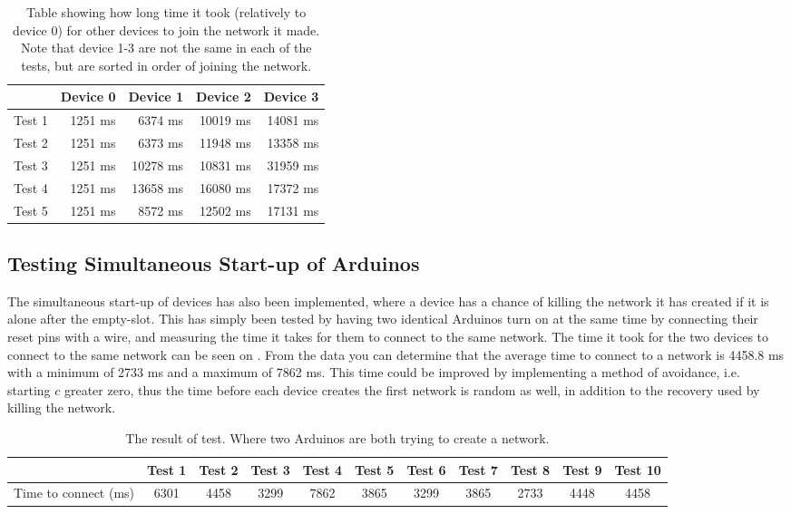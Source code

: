 \begin{table}[H]
\footnotesize
\centering  
{}
\begin{tabular}{r | r r r r}
        & Device 0  & Device 1  & Device 2  & Device 3  \\\midrule
 Test 1 &   1251 ms &   6374 ms &   10019 ms&   14081 ms\\
 Test 2 &   1251 ms &   6373 ms &   11948 ms&   13358 ms\\
 Test 3 &   1251 ms &   10278 ms&   10831 ms&   31959 ms\\
 Test 4 &   1251 ms &   13658 ms&   16080 ms&   17372 ms\\
 Test 5 &   1251 ms &   8572 ms &   12502 ms&   17131 ms\\   
\end{tabular}
\caption{Table showing how long time it took (relatively to device 0) for other devices to join the network it made. Note that device 1-3 are not the same in each of the tests, but are sorted in order of joining the network.}
\label{tab:ccrc_test}
\end{table}

\subsection{Testing Simultaneous Start-up of Arduinos}
The simultaneous start-up of devices has also been implemented, where a device has a chance of killing the network it has created if it is alone after the empty-slot.
This has simply been tested by having two identical Arduinos turn on at the same time by connecting their reset pins with a wire, and measuring the time it takes for them to connect to the same network.
The time it took for the two devices to connect to the same network can be seen on .
From the data you can determine that the average time to connect to a network is 4458.8 ms with a minimum of 2733 ms and a maximum of 7862 ms.
This time could be improved by implementing a method of avoidance, i.e. starting $c$ greater zero, thus the time before each device creates the first network is random as well, in addition to the recovery used by killing the network.

\begin{table}[H]
\centering\scriptsize
\begin{tabularx}{\textwidth}{X|c c c c c c c c c c}
                          & Test 1 & Test 2 & Test 3 & Test 4 & Test 5 & Test 6 & Test 7 & Test 8 & Test 9 & Test 10\\
                          \midrule
    Time to connect (ms)  & 6301   & 4458   & 3299   & 7862   & 3865   & 3299   & 3865   & 2733   & 4448   & 4458
\end{tabularx}
\caption{The result of test. Where two Arduinos are both trying to create a network.}
\label{graphConnectime}
\end{table} 
